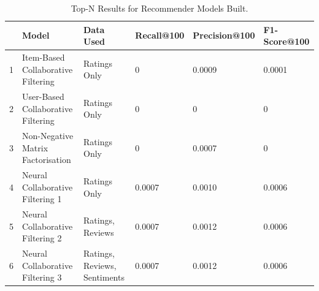 \begin{table}[htbp]
    \centering
    \begin{tabular}{|l|l|p{2cm}|l|l|l|}
    \hline
    &\textbf{Model} & \textbf{Data Used} & \textbf{Recall@100} & \textbf{Precision@100} & \textbf{F1-Score@100} \\
    \hline
    1&Item-Based Collaborative Filtering & Ratings Only & 0 & 0.0009 & 0.0001 \\
    2&User-Based Collaborative Filtering & Ratings Only & 0 & 0 & 0 \\
    3&Non-Negative Matrix Factorisation & Ratings Only & 0 & 0.0007 & 0  \\
    4&Neural Collaborative Filtering 1 & Ratings Only & 0.0007 & 0.0010 & 0.0006 \\
    5&Neural Collaborative Filtering 2 & Ratings, Reviews & 0.0007 & 0.0012 & 0.0006 \\
    6&Neural Collaborative Filtering 3 & Ratings, Reviews, Sentiments & 0.0007 & 0.0012 & 0.0006 \\
    \hline
    \end{tabular}
    \caption{Top-N Results for Recommender Models Built.}
    \label{tab:top_n_res}
\end{table}

